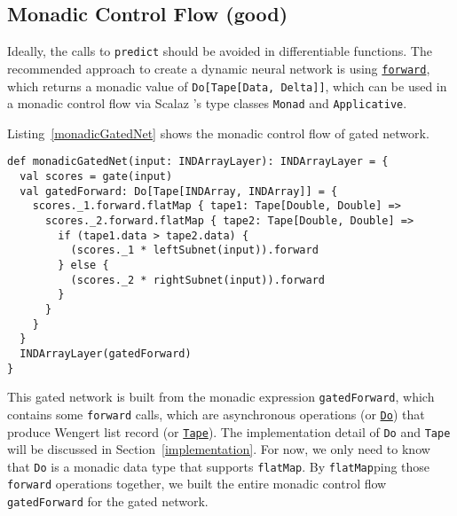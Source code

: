 \subsection{Monadic Control Flow (good)}
\label{monadic}

Ideally, the calls to \lstinline{predict} should be avoided in differentiable functions. The recommended approach to create a dynamic neural network is using \href{https://javadoc.io/page/com.thoughtworks.deeplearning/deeplearning_2.11/latest/com/thoughtworks/deeplearning/DeepLearning.html#forward(differentiable:Differentiable):com.thoughtworks.raii.asynchronous.Do[com.thoughtworks.deeplearning.DeepLearning.Tape[DeepLearning.this.Data,DeepLearning.this.Delta]]}{\lstinline{forward}}, which returns a monadic value of \lstinline{Do[Tape[Data, Delta]]}, which can be used in a monadic control flow via Scalaz \cite{kenji2017scalaz}'s type classes \cite{oliveira2010type} \lstinline{Monad} and \lstinline{Applicative}.

Listing~\ref{monadicGatedNet} shows the monadic control flow of gated network.

\begin{lstlisting}[float={h t b p},caption={Monadic gated network}, label={monadicGatedNet}]
def monadicGatedNet(input: INDArrayLayer): INDArrayLayer = {
  val scores = gate(input)
  val gatedForward: Do[Tape[INDArray, INDArray]] = {
    scores._1.forward.flatMap { tape1: Tape[Double, Double] =>
      scores._2.forward.flatMap { tape2: Tape[Double, Double] =>
        if (tape1.data > tape2.data) {
          (scores._1 * leftSubnet(input)).forward
        } else {
          (scores._2 * rightSubnet(input)).forward
        }
      }
    }
  }
  INDArrayLayer(gatedForward)
}
\end{lstlisting}

This gated network is built from the monadic expression \lstinline{gatedForward}, which contains some \lstinline{forward} calls, which are asynchronous operations (or \href{https://javadoc.io/page/com.thoughtworks.raii/asynchronous_2.11/latest/com/thoughtworks/raii/asynchronous%24%24Do.html}{\lstinline{Do}}) that produce Wengert list record (or \href{https://javadoc.io/page/com.thoughtworks.deeplearning/deeplearning_2.11/latest/com/thoughtworks/deeplearning/DeepLearning%24%24Tape.html}{\lstinline{Tape}}). The implementation detail of \lstinline{Do} and \lstinline{Tape} will be discussed in Section~\ref{implementation}. For now, we only need to know that \lstinline{Do} is a monadic data type that supports \lstinline{flatMap}. By \lstinline{flatMap}ping those \lstinline{forward} operations together, we built the entire monadic control flow \lstinline{gatedForward} for the gated network.

